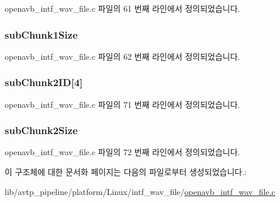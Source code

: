 openavb\+\_\+intf\+\_\+wav\+\_\+file.\+c 파일의 61 번째 라인에서 정의되었습니다.

\subsubsection[{\texorpdfstring{sub\+Chunk1\+Size}{subChunk1Size}}]{ sub\+Chunk1\+Size}\hypertarget{structwav__file__header__t_a6b429e58995a5c2212785a8982dc9be9}{}\label{structwav__file__header__t_a6b429e58995a5c2212785a8982dc9be9}


openavb\+\_\+intf\+\_\+wav\+\_\+file.\+c 파일의 62 번째 라인에서 정의되었습니다.

\subsubsection[{\texorpdfstring{sub\+Chunk2\+ID}{subChunk2ID}}]{ sub\+Chunk2\+ID\mbox{[}4\mbox{]}}\hypertarget{structwav__file__header__t_a43f56838fbd1e92eb08c25cc6ef3f2ac}{}\label{structwav__file__header__t_a43f56838fbd1e92eb08c25cc6ef3f2ac}


openavb\+\_\+intf\+\_\+wav\+\_\+file.\+c 파일의 71 번째 라인에서 정의되었습니다.

\subsubsection[{\texorpdfstring{sub\+Chunk2\+Size}{subChunk2Size}}]{ sub\+Chunk2\+Size}\hypertarget{structwav__file__header__t_af80f19aa643eb5f1a47e3b3d5a5d75b1}{}\label{structwav__file__header__t_af80f19aa643eb5f1a47e3b3d5a5d75b1}


openavb\+\_\+intf\+\_\+wav\+\_\+file.\+c 파일의 72 번째 라인에서 정의되었습니다.



이 구조체에 대한 문서화 페이지는 다음의 파일로부터 생성되었습니다.\+:\begin{DoxyCompactItemize}
\item 
lib/avtp\+\_\+pipeline/platform/\+Linux/intf\+\_\+wav\+\_\+file/\hyperlink{openavb__intf__wav__file_8c}{openavb\+\_\+intf\+\_\+wav\+\_\+file.\+c}\end{DoxyCompactItemize}
